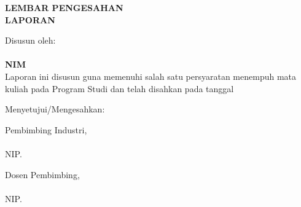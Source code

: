 
\newpage
{}
\begin{center}
    \begin{doublespace}
        \textbf{\large \MakeUppercase{lembar pengesahan}}\\
        \textbf{\large \MakeUppercase{Laporan {\tipe}}}
    \end{doublespace}
\end{center}

\begin{center}
    \begin{doublespace}
        \textbf{\large \MakeUppercase {\judulid}}
    \end{doublespace}
\end{center}

\begin{center}
    Disusun oleh:\\
    \textbf{\penulis}\\
    \textbf{NIM \nim}\\[1.5cm]

    Laporan ini disusun guna memenuhi salah satu persyaratan menempuh mata kuliah {\tipe} pada Program Studi {\prodi} {\fakultas} {\universitas} dan telah disahkan pada tanggal \tglpengesahan\\[0.75cm]
\end{center}

\begin{center}
    Menyetujui/Mengesahkan:\\
\end{center}

\begin{minipage}{0.35\textwidth}
    Pembimbing Industri,\\[2cm]
    \pembimbingindustri\\
    NIP. \NIKpembimbingindustri
\end{minipage}
\hfill
\begin{minipage}{0.47\textwidth}
    Dosen Pembimbing,\\[2cm]
    \resizebox{\textwidth}{!}{\pembimbing}\\
    NIP. \NIPpembimbing
\end{minipage}%


